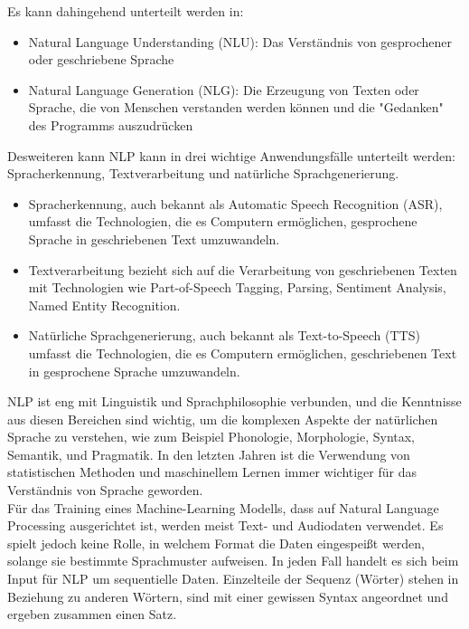 \documentclass[oneside,bibliography=totocnumbered,BCOR=5mm]{scrbook}%
\theoremstyle{definition}
\theoremstyle{definition}
\theoremstyle{definition}
\theoremstyle{definition}
\theoremstyle{definition}
\theoremstyle{definition}
\begin{document}
Es kann dahingehend unterteilt werden in:
\begin{itemize}
  \item Natural Language Understanding (NLU): Das Verständnis von gesprochener oder geschriebene Sprache \autocite{NLPfundamentals}
  \item Natural Language Generation (NLG): Die Erzeugung von Texten oder Sprache, die von Menschen verstanden werden können
  und die "Gedanken" des Programms auszudrücken \autocite{NLPfundamentals}
\end{itemize}  


Desweiteren kann NLP kann in drei wichtige Anwendungsfälle unterteilt werden: Spracherkennung, Textverarbeitung und natürliche Sprachgenerierung. \\

\begin{itemize}
  \item  Spracherkennung, auch bekannt als Automatic Speech Recognition (ASR), umfasst die Technologien, 
  die es Computern ermöglichen, gesprochene Sprache in geschriebenen Text umzuwandeln.


  \item Textverarbeitung bezieht sich auf die Verarbeitung von geschriebenen Texten mit Technologien wie Part-of-Speech Tagging, 
  Parsing, Sentiment Analysis, Named Entity Recognition.


  \item Natürliche Sprachgenerierung, auch bekannt als Text-to-Speech (TTS) umfasst die Technologien, 
  die es Computern ermöglichen, geschriebenen Text in gesprochene Sprache umzuwandeln.
\end{itemize}  

NLP ist eng mit Linguistik und Sprachphilosophie verbunden, 
und die Kenntnisse aus diesen Bereichen sind wichtig, um die komplexen Aspekte der natürlichen Sprache zu verstehen, 
wie zum Beispiel Phonologie, Morphologie, Syntax, Semantik, und Pragmatik.
In den letzten Jahren ist die Verwendung von statistischen Methoden und 
maschinellem Lernen immer wichtiger für das Verständnis von Sprache geworden.\\


Für das Training eines Machine-Learning Modells, dass auf Natural Language Processing 
ausgerichtet ist, werden meist Text- und Audiodaten verwendet. 
Es spielt jedoch keine Rolle, in welchem Format die Daten eingespeißt werden, 
solange sie bestimmte Sprachmuster aufweisen. In jeden Fall handelt es sich beim Input für NLP um sequentielle Daten. 
Einzelteile der Sequenz (Wörter) stehen in Beziehung zu anderen Wörtern, 
sind mit einer gewissen Syntax angeordnet und ergeben zusammen einen Satz. \\
\end{document}
